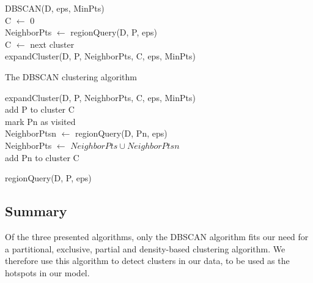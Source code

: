 \begin{algorithm}[h]
DBSCAN(D, eps, MinPts)\\
	C $\leftarrow$ 0\\
	{
		NeighborPts $\leftarrow$ regionQuery(D, P, eps)\\
		{
			C $\leftarrow$ next cluster\\
			expandCluster(D, P, NeighborPts, C, eps, MinPts)
		}
	}
\caption{The DBSCAN clustering algorithm}\label{dbscan-algo}
\phantom{ForLineBreak}
\setcounter{AlgoLine}{0}

expandCluster(D, P, NeighborPts, C, eps, MinPts)\\
	add P to cluster C\\
	{
		{
			mark Pn as visited\\
			NeighborPtsn $\leftarrow$ regionQuery(D, Pn, eps)\\
		}
		{
			NeighborPts $\leftarrow$ $ NeighborPts \cup NeighborPtsn $\\
			{
				{add Pn to cluster C\\}
			}
		}
	}
\phantom{ForLineBreak}
\setcounter{AlgoLine}{0}

regionQuery(D, P, eps)\\
\end{algorithm}

\subsection{Summary} Of the three presented algorithms, only the DBSCAN algorithm fits our need for a partitional, exclusive, partial and density-based clustering algorithm.
We therefore use this algorithm to detect clusters in our data, to be used as the hotspots in our model.
